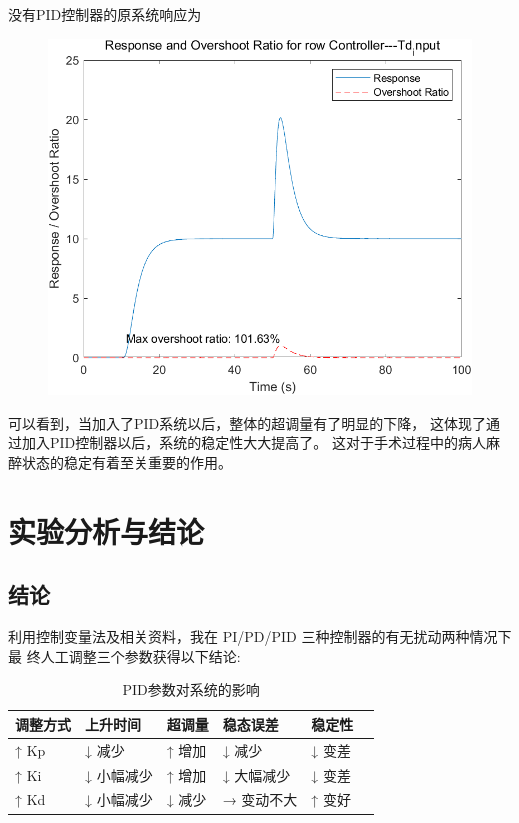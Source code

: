 \documentclass{thuemp}
\begin{document}
没有PID控制器的原系统响应为
\begin{figure}[H]
\centering
\includegraphics[width=0.8\linewidth]{./img/None_p2_Td.png}
\end{figure}
可以看到，当加入了PID系统以后，整体的超调量有了明显的下降，
这体现了通过加入PID控制器以后，系统的稳定性大大提高了。
这对于手术过程中的病人麻醉状态的稳定有着至关重要的作用。


\section{实验分析与结论}
\subsection{结论}
利用控制变量法及相关资料，我在
PI/PD/PID 三种控制器的有无扰动两种情况下最
终人工调整三个参数获得以下结论:

\begin{table}[!ht]
  \centering
  \captionnamefont{\wuhao\bf\heiti}
  \captiontitlefont{\wuhao\bf\heiti}
  \caption{PID参数对系统的影响} 
  \begin{tabular}{llllll}
      \toprule
      调整方式 & 上升时间 & 超调量 & 稳态误差 & 稳定性 \\ 
      \midrule
      ↑ Kp & ↓ 减少 & ↑ 增加 & ↓ 减少 & ↓ 变差 \\ 
      ↑ Ki & ↓ 小幅减少 & ↑ 增加 & ↓ 大幅减少 & ↓ 变差 \\ 
      ↑ Kd & ↓ 小幅减少 & ↓ 减少 & → 变动不大 & ↑ 变好 \\
      \bottomrule
  \end{tabular}
\end{table}
\end{document}
